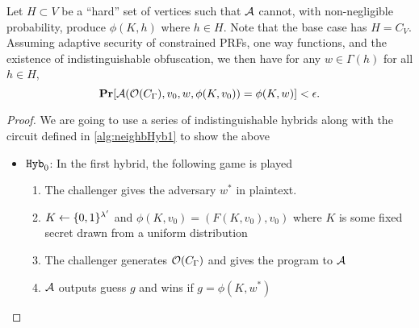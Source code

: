 \begin{lemma}
	Let $H \subset V$ be a ``hard'' set of vertices such that $\mathcal{A}$ cannot, with non-negligible probability, produce 
	$\phi(K, h)$ where $h \in H$. Note that the base case has $H = C_V$. 
	Assuming adaptive security of constrained PRFs, one way functions, and the existence of indistinguishable obfuscation,
	we then have
	for any $w \in \Gamma(h)$ for all $h \in H$, 
	\begin{equation*}
		\operatorname*{\mathbf{Pr}}[\mathcal{A}(\mathcal{O}(C_\Gamma), v_0, w, \phi(K, v_0)) = \phi(K, w)] < \epsilon.
	\end{equation*}
	\begin{proof}
		We are going to use a series of indistinguishable hybrids along with the circuit defined in \ref{alg:neighbHyb1} to show the above
		\begin{itemize}
			\item $\texttt{Hyb}_0$: In the first hybrid, the following game is played
				\begin{enumerate}
					\item The challenger gives the adversary $w^*$ in plaintext.
					\item $K \gets \{0,1\}^{\lambda'}$ and $\phi(K, v_0) = (F(K, v_0), v_0)$ where $K$ is some fixed secret drawn from a uniform distribution
					\item The challenger generates $\mathcal{O}(C_\Gamma)$ and gives the program to $\mathcal{A}$
					\item $\mathcal{A}$ outputs guess $g$ and wins if $g = \phi(K, w^*)$ %
				\end{enumerate}
			

\end{itemize}
\end{proof}
\end{lemma}
